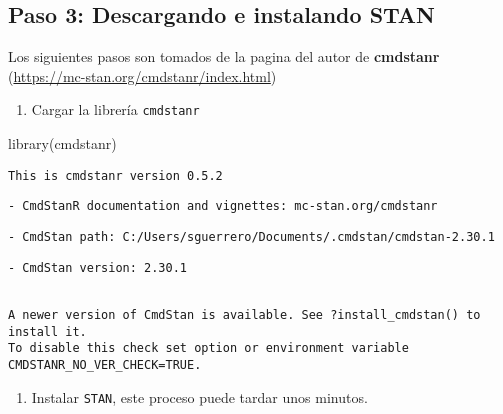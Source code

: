 \documentclass[
  letterpaper,
  DIV=11,
  numbers=noendperiod]{scrartcl}
\newenvironment{Shaded}{\begin{snugshade}}{\end{snugshade}}
\newcommand{\FunctionTok}[1]{\textcolor[rgb]{0.28,0.35,0.67}{#1}}
\newcommand{\NormalTok}[1]{\textcolor[rgb]{0.00,0.23,0.31}{#1}}
\providecommand{\tightlist}{%
  \setlength{\itemsep}{0pt}\setlength{\parskip}{0pt}}\usepackage{longtable,booktabs,array}
\begin{document}
\hypertarget{paso-3-descargando-e-instalando-stan}{%
\subsection{\texorpdfstring{Paso 3: Descargando e instalando
\textbf{STAN}}{Paso 3: Descargando e instalando STAN}}\label{paso-3-descargando-e-instalando-stan}}

Los siguientes pasos son tomados de la pagina del autor de
\textbf{cmdstanr} (\url{https://mc-stan.org/cmdstanr/index.html})

\begin{enumerate}
\def\labelenumi{\arabic{enumi}.}
\tightlist
\item
  Cargar la librería \texttt{cmdstanr}
\end{enumerate}

\begin{Shaded}
\begin{Highlighting}[]
\FunctionTok{library}\NormalTok{(cmdstanr)}
\end{Highlighting}
\end{Shaded}

\begin{verbatim}
This is cmdstanr version 0.5.2
\end{verbatim}

\begin{verbatim}
- CmdStanR documentation and vignettes: mc-stan.org/cmdstanr
\end{verbatim}

\begin{verbatim}
- CmdStan path: C:/Users/sguerrero/Documents/.cmdstan/cmdstan-2.30.1
\end{verbatim}

\begin{verbatim}
- CmdStan version: 2.30.1
\end{verbatim}

\begin{verbatim}

A newer version of CmdStan is available. See ?install_cmdstan() to install it.
To disable this check set option or environment variable CMDSTANR_NO_VER_CHECK=TRUE.
\end{verbatim}

\begin{enumerate}
\def\labelenumi{\arabic{enumi}.}
\setcounter{enumi}{1}
\tightlist
\item
  Instalar \texttt{STAN}, este proceso puede tardar unos minutos.
\end{enumerate}
\end{document}
